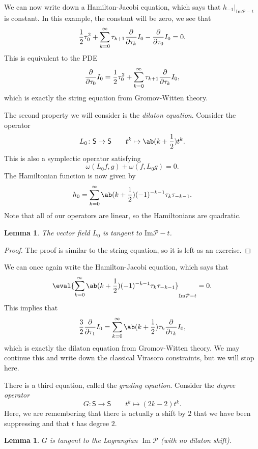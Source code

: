\documentclass[article,10pt,oneside,oldfontcommands]{memoir}
\newtheorem{lem}[thm]{Lemma}
\theoremstyle{definition}
\theoremstyle{remark}
\theoremstyle{plain}
\theoremstyle{definition}
\theoremstyle{remark}
\newcommand{\Ima}{\mathrm{Im}}
\newcommand{\mc}[1]{\mathcal{#1}}
\newcommand{\on}[1]{\operatorname{#1}}
\newcommand{\ms}[1]{\mathsf{#1}}
\newcommand{\1}{\mathbf{1}}
\newcommand{\2}{\mathbf{2}}
\newcommand{\3}{\mathbf{3}}
\begin{document}
We can now write down a Hamilton-Jacobi equation, which says that \(h_{-1}|_{\Ima\mc{P} - t}\) is constant. In this example, the constant will be zero, we see that
\begin{align*}
    \frac{1}{2} \tau_0^2 + \sum_{k = 0}^{\infty} \tau_{k+1} \pdv{}{\tau_k} I_0 - \pdv{}{\tau_0} I_0 = 0.
\end{align*}
This is equivalent to the PDE
\[ \pdv{}{\tau_0} I_0 = \frac{1}{2} \tau_0^2 + \sum_{k = 0}^{\infty} \tau_{k+1} \pdv{}{\tau_k} I_0, \]
which is exactly the string equation from Gromov-Witten theory.

The second property we will consider is the \textit{dilaton equation}. Consider the operator
\[ L_0 \colon \ms{S} \to \ms{S} \qquad t^k \mapsto \ab(k + \frac{1}{2}) t^k. \]
This is also a symplectic operator satisfying
\[ \omega(L_0 f, g) + \omega(f, L_0 g) = 0. \]
The Hamiltonian function is now given by
\[ h_0 = \sum_{k=0}^{\infty} \ab(k + \frac{1}{2}) (-1)^{-k-1} \tau_k \tau_{-k-1}. \]
Note that all of our operators are linear, so the Hamiltonians are quadratic. 

\begin{lem}
    The vector field \(L_0\) is tangent to \(\Ima\mc{P} - t\).
\end{lem}

\begin{proof}
    The proof is similar to the string equation, so it is left as an exercise.
\end{proof}

We can once again write the Hamilton-Jacobi equation, which says that
\[ \eval{\sum_{k=0}^{\infty} \ab(k + \frac{1}{2}) (-1)^{-k-1} \tau_k \tau_{-k-1}}_{\Ima\mc{P} - t} = 0. \]
This implies that
\[ \frac{3}{2} \pdv{}{\tau_1} I_0 = \sum_{k=0}^{\infty} \ab(k + \frac{1}{2}) \tau_k \pdv{}{\tau_k} I_0, \]
which is exactly the dilaton equation from Gromov-Witten theory. We may continue this and write down the classical Virasoro constraints, but we will stop here.

There is a third equation, called the \textit{grading equation}. Consider the \textit{degree operator}
\[ G \colon \ms{S} \to \ms{S} \qquad t^k \mapsto (2k-2) t^k. \]
Here, we are remembering that there is actually a shift by \(2\) that we have been suppressing and that \(t\) has degree \(2\).

\begin{lem}
    \(G\) is tangent to the Lagrangian \(\on{Im} \mc{P}\) (with no dilaton shift).
\end{lem}
\end{document}
